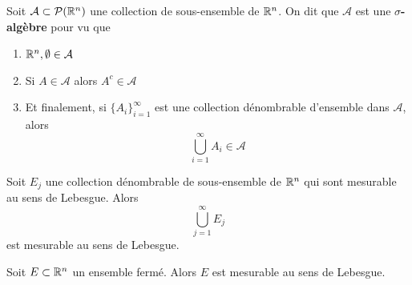 \begin{definition} \label{def: sigma algèbre}
	Soit $\mathcal A \subset \mathcal P(\mathbb{R}^n)$ une collection de sous-ensemble de $\mathbb{R}^n$. On dit que $\mathcal A$ est une $\sigma$\textbf{-algèbre} pour vu que
	\begin{enumerate}
		\item $\mathbb{R}^n, \emptyset \in \mathcal A$
		\item Si $A \in \mathcal A$ alors $A^c \in \mathcal A$
		\item Et finalement, si $\{A_i\}_{i=1}^\infty$ est une collection dénombrable d'ensemble dans $\mathcal A$, alors
		\[
		\bigcup_{i=1}^\infty A_i \in \mathcal A
		\]
	\end{enumerate}
\end{definition}


\begin{proposition} \label{prop: Mesurabilité d'une union}
	Soit $E_j$ une collection dénombrable de sous-ensemble de $\mathbb{R}^n$ qui sont mesurable au sens de Lebesgue. Alors
	\[
	\bigcup_{j=1}^\infty E_j 
	\]
	est mesurable au sens de Lebesgue.
\end{proposition}
\begin{lemme} \label{lem: Mesurabilité d'un fermé}
	Soit $E \subset \mathbb{R}^n$ un ensemble fermé. Alors $E$ est mesurable au sens de Lebesgue.
\end{lemme}

